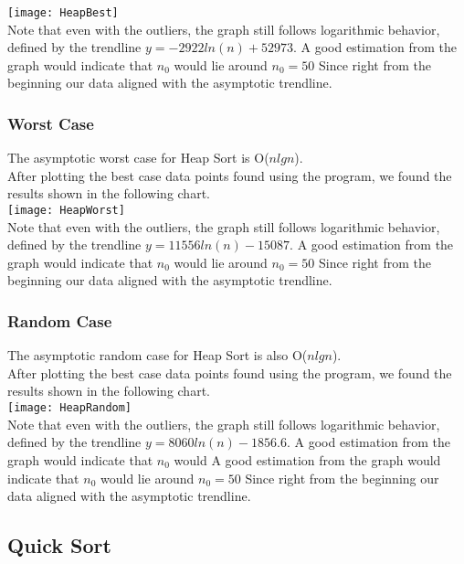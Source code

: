 \documentclass[12pt]{article}
\begin{document}
\texttt{[image: HeapBest]}\\

Note that even with the outliers, the graph still follows logarithmic behavior, defined by the trendline $y = -2922ln(n) + 52973 $. A good estimation from the graph would indicate that $n_0$ would lie around $n_0 = 50 $ Since right from the beginning our data aligned with the asymptotic trendline.
\subsubsection*{Worst  Case}
The asymptotic worst case for Heap Sort is O($nlgn$).\\

After plotting the best case data points found using the program, we found the results shown in the following chart. \\

\texttt{[image: HeapWorst]}\\

Note that even with the outliers, the graph still follows logarithmic behavior, defined by the trendline $y = 11556ln(n)-15087$.  A good estimation from the graph would indicate that $n_0$ would lie around $n_0 = 50 $ Since right from the beginning our data aligned with the asymptotic trendline.
\subsubsection*{Random Case}

The asymptotic random case for Heap Sort is also O($nlgn$).\\

After plotting the best case data points found using the program, we found the results shown in the following chart. \\

\texttt{[image: HeapRandom]}\\

Note that even with the outliers, the graph still follows logarithmic behavior, defined by the trendline $y = 8060 ln(n)-1856.6$. A good estimation from the graph would indicate that $n_0$ would  A good estimation from the graph would indicate that $n_0$ would lie around $n_0 = 50 $ Since right from the beginning our data aligned with the asymptotic trendline.

\subsection*{Quick Sort}
\end{document}
